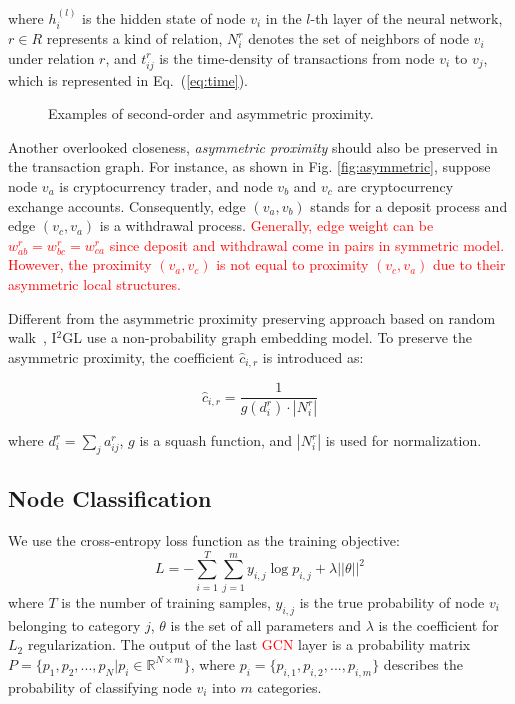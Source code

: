 \noindent where $h_i^{(l)}$ is the hidden state of node $v_i$ in the $l$-th layer of the neural network, $r \in R$ represents a kind of relation, $N_i^r$ denotes the set of neighbors of node $v_i$ under relation $r$, and $t_{ij}^r$ is the time-density of transactions from node $v_i$ to $v_j$, which is represented in Eq.~(\ref{eq:time}).


\begin{figure}[htbp]
	\centering
	\caption{Examples of second-order and asymmetric proximity.}

\end{figure}


Another overlooked closeness, \emph{asymmetric proximity} should also be preserved in the transaction graph. For instance, as shown in Fig. \ref{fig:asymmetric}, suppose node $v_a$ is cryptocurrency trader, and node $v_b$ and $v_c$ are cryptocurrency exchange accounts. Consequently, edge $(v_a,v_b)$ stands for a deposit process and edge $(v_c,v_a)$ is a withdrawal process. \textcolor{red}{Generally, edge weight can be $w^r_{ab}=w^r_{bc}=w^r_{ca}$ since deposit and withdrawal come in pairs in symmetric model. However, the proximity $(v_a,v_c)$ is not equal to proximity $(v_c,v_a)$ due to their asymmetric local structures.}

Different from the asymmetric proximity preserving approach based on random walk~\cite{zhou2017scalable}, I$^2$GL use a non-probability graph embedding model. To preserve the asymmetric proximity, the coefficient $\hat c_{i,r}$ is introduced as:

\begin{equation}
\hat c_{i,r}=\frac{1}{g(d_i^r)\cdot |N_i^r|}
\end{equation}

\noindent where $d_i^r=\sum_{j}a^r_{ij}$, $g$ is a squash function, and $|N_i^r|$ is used for normalization.



\subsection{Node Classification}
We use the cross-entropy loss function as the training objective:
\begin{equation}
L=-\sum_{i=1}^T\sum_{j=1}^m y_{i,j}\log p_{i,j}+\lambda ||\theta||^2
\end{equation}
where $T$ is the number of training samples, $y_{i,j}$ is the true probability of node $v_i$ belonging to category $j$, $\theta$ is the set of all parameters and $\lambda$ is the coefficient for $L_2$  regularization. The output of the last \textcolor{red}{GCN} layer is a probability matrix $P=\{p_1,p_2,...,p_N|p_i\in \mathbb{R}^{N \times m}\}$, where $p_i=\{p_{i,1},p_{i,2},...,p_{i,m}\}$ describes the probability of classifying node $v_i$ into $m$ categories. 
